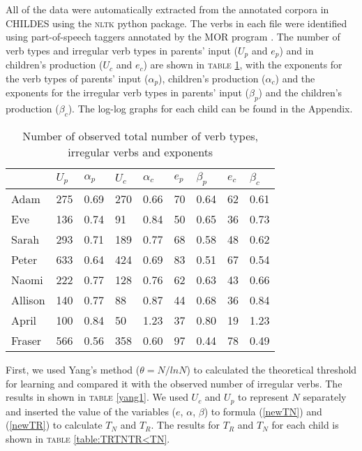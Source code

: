 All of the data were automatically extracted from the annotated corpora in CHILDES using the \textsc{nltk} python package. The verbs in each file were identified using part-of-speech taggers annotated by the MOR program \citep{macwhinney2012morphosyntactic}. The number of verb types and irregular verb types in parents' input ($U_p$ and $e_p$) and in children's production ($U_c$ and $e_c$) are shown in \textsc{table} \ref{table:UEAB}, with the exponents for the verb types of parents' input ($\alpha_p$), children's production ($\alpha_c$) and the exponents for the irregular verb types in parents' input ($\beta_p$) and the children's production ($\beta_c$). The log-log graphs for each child can be found in the Appendix.


\begin{table}[htb]
\centering
\caption{Number of observed total number of verb types, irregular verbs and exponents}
\label{table:UEAB}
\begin{tabular}{lllllllll}
\toprule
 & $U_p$ & $\alpha_p$ & $U_c$ & $\alpha_c$ & $e_p$ & $\beta_p$ & $e_c$ & $\beta_c$ \\
\hline
Adam & 275 & 0.69 & 270 & 0.66 & 70 & 0.64 & 62 & 0.61 \\
Eve & 136 & 0.74 & 91 & 0.84 & 50 & 0.65 & 36 & 0.73 \\
Sarah & 293 & 0.71 & 189 & 0.77 & 68 & 0.58 & 48 & 0.62 \\
Peter & 633 & 0.64 & 424 & 0.69 & 83 & 0.51 & 67 & 0.54 \\
Naomi & 222 & 0.77 & 128 & 0.76 & 62 & 0.63 & 43 & 0.66 \\
Allison & 140 & 0.77 & 88 & 0.87 & 44 & 0.68 & 36 & 0.84 \\
April & 100 & 0.84 & 50 & 1.23 & 37 & 0.80 & 19 & 1.23 \\
Fraser & 566 & 0.56 & 358 & 0.60 & 97 & 0.44 & 78 & 0.49 \\
\bottomrule
\end{tabular}
\end{table}

First, we used Yang's method ($\theta = N/lnN$) to calculated the theoretical threshold for learning and compared it with the observed number of irregular verbs. The results in shown in \textsc{table} \ref{yang1}. We used $U_c$ and $U_p$ to represent $N$ separately and inserted the value of the variables ($e$, $\alpha$, $\beta$) to formula (\ref{newTN}) and (\ref{newTR}) to calculate $T_N$ and $T_R$. The results for $T_R$ and $T_N$ for each child is shown in \textsc{table} \ref{table:TRTNTR<TN}. 







